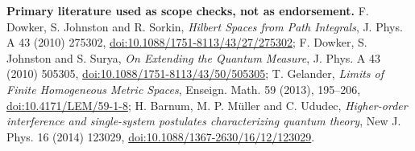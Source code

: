 \documentclass[11pt]{article}
\begin{document}
\smallskip\noindent\textbf{Primary literature used as scope checks, not as endorsement.}
F. Dowker, S. Johnston and R. Sorkin, \emph{Hilbert Spaces from Path Integrals}, J. Phys. A 43 (2010) 275302, \href{https://doi.org/10.1088/1751-8113/43/27/275302}{doi:10.1088/1751-8113/43/27/275302};
F. Dowker, S. Johnston and S. Surya, \emph{On Extending the Quantum Measure}, J. Phys. A 43 (2010) 505305, \href{https://doi.org/10.1088/1751-8113/43/50/505305}{doi:10.1088/1751-8113/43/50/505305};
T. Gelander, \emph{Limits of Finite Homogeneous Metric Spaces}, Enseign. Math. 59 (2013), 195--206, \href{https://doi.org/10.4171/LEM/59-1-8}{doi:10.4171/LEM/59-1-8};
H. Barnum, M. P. M\"uller and C. Ududec, \emph{Higher-order interference and single-system postulates characterizing quantum theory}, New J. Phys. 16 (2014) 123029, \href{https://doi.org/10.1088/1367-2630/16/12/123029}{doi:10.1088/1367-2630/16/12/123029}.
\end{document}
